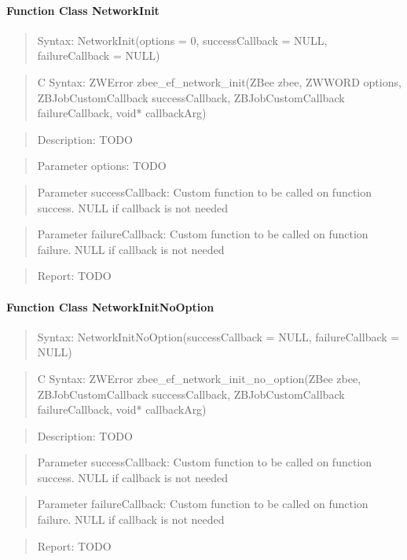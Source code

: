 \paragraph{Function Class NetworkInit}
\begin{quote}Syntax: NetworkInit(options = 0, successCallback = NULL, failureCallback = NULL)\end{quote}
\begin{quote}C Syntax: ZWError zbee\_ef\_network\_init(ZBee zbee, ZWWORD options, ZBJobCustomCallback successCallback, ZBJobCustomCallback failureCallback, void* callbackArg)\end{quote}
\begin{quote}Description: TODO\end{quote}
\begin{quote}Parameter options: TODO\end{quote}
\begin{quote}Parameter successCallback: Custom function to be called on function success. NULL if callback is not needed\end{quote}
\begin{quote}Parameter failureCallback: Custom function to be called on function failure. NULL if callback is not needed\end{quote}
\begin{quote}Report: TODO\end{quote}

\paragraph{Function Class NetworkInitNoOption}
\begin{quote}Syntax: NetworkInitNoOption(successCallback = NULL, failureCallback = NULL)\end{quote}
\begin{quote}C Syntax: ZWError zbee\_ef\_network\_init\_no\_option(ZBee zbee, ZBJobCustomCallback successCallback, ZBJobCustomCallback failureCallback, void* callbackArg)\end{quote}
\begin{quote}Description: TODO\end{quote}
\begin{quote}Parameter successCallback: Custom function to be called on function success. NULL if callback is not needed\end{quote}
\begin{quote}Parameter failureCallback: Custom function to be called on function failure. NULL if callback is not needed\end{quote}
\begin{quote}Report: TODO\end{quote}

